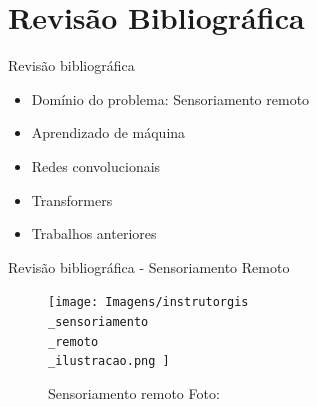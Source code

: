 \documentclass{beamer}
\begin{document}
\section{Revisão Bibliográfica} 
\begin{frame}{Revisão bibliográfica }
\begin{itemize}
    \item Domínio do problema: Sensoriamento remoto
    \item Aprendizado de máquina
    \item Redes convolucionais
    \item Transformers
    \item Trabalhos anteriores
\end{itemize}

\end{frame}


\begin{frame}{Revisão bibliográfica - Sensoriamento Remoto}
    \begin{figure}[!ht]
        \centering
        \texttt{[image: 
            Imagens/instrutorgis\\\_sensoriamento\\\_remoto\\\_ilustracao.png
        ]}
        \caption{Sensoriamento remoto Foto:\cite{InstrutorGIS}}
    \label{fig:sensoriamento}
    \end{figure}
    \end{frame}
\end{document}
